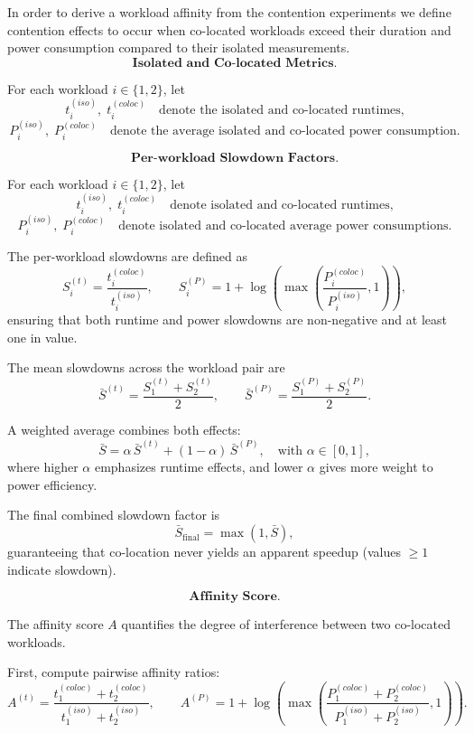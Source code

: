 In order to derive a workload affinity from the contention experiments we define contention effects to occur when co-located workloads exceed their duration and power consumption compared to their isolated measurements.
\[
    \textbf{Isolated and Co-located Metrics.}
\]

For each workload \( i \in \{1,2\} \), let
\[
    t_i^{(iso)}, \; t_i^{(coloc)} \quad \text{denote the isolated and co-located runtimes,}
\]
\[
    P_i^{(iso)}, \; P_i^{(coloc)} \quad \text{denote the average isolated and co-located power consumption.}
\]

\[
    \textbf{Per-workload Slowdown Factors.}
\]

For each workload \( i \in \{1, 2\} \), let
\[
    t_i^{(iso)}, \; t_i^{(coloc)} \quad \text{denote isolated and co-located runtimes,}
\]
\[
    P_i^{(iso)}, \; P_i^{(coloc)} \quad \text{denote isolated and co-located average power consumptions.}
\]

The per-workload slowdowns are defined as
\[
    S_i^{(t)} = \frac{t_i^{(coloc)}}{t_i^{(iso)}},
    \qquad
    S_i^{(P)} = 1 + \log\!\left(
    \max\!\left( \frac{P_i^{(coloc)}}{P_i^{(iso)}}, 1 \right)
    \right),
\]
ensuring that both runtime and power slowdowns are
non-negative and at least one in value.

The mean slowdowns across the workload pair are
\[
    \bar{S}^{(t)} = \frac{S_1^{(t)} + S_2^{(t)}}{2},
    \qquad
    \bar{S}^{(P)} = \frac{S_1^{(P)} + S_2^{(P)}}{2}.
\]

A weighted average combines both effects:
\[
    \bar{S} =
    \alpha\, \bar{S}^{(t)} + (1 - \alpha)\, \bar{S}^{(P)},
    \quad \text{with } \alpha \in [0,1],
\]
where higher \(\alpha\) emphasizes runtime effects,
and lower \(\alpha\) gives more weight to power efficiency.

The final combined slowdown factor is
\[
    \bar{S}_{\text{final}} = \max(1, \bar{S}),
\]
guaranteeing that co-location never yields an apparent
speedup (values \(\ge 1\) indicate slowdown).

\[
    \textbf{Affinity Score.}
\]

The affinity score \(A\) quantifies the degree of
interference between two co-located workloads.

First, compute pairwise affinity ratios:
\[
    A^{(t)} =
    \frac{t_1^{(coloc)} + t_2^{(coloc)}}
    {t_1^{(iso)} + t_2^{(iso)}},
    \qquad
    A^{(P)} =
    1 + \log\!\left(
    \max\!\left(
    \frac{P_1^{(coloc)} + P_2^{(coloc)}}
    {P_1^{(iso)} + P_2^{(iso)}},
    1
    \right)
    \right).
\]

